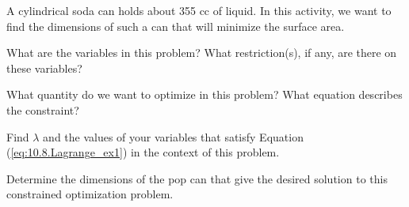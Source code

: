 \begin{activity} \label{A:10.8.1} A cylindrical soda can holds
  about 355 cc of liquid. In this activity, we want to find the
  dimensions of such a can that will minimize the surface area.  
\ba
    \item What are the variables in this problem? What restriction(s),
      if any, are there on these variables? 

    \item What quantity do we want to optimize in this problem? What
      equation describes the constraint? 

    \item Find $\lambda$ and the values of your variables that satisfy
      Equation (\ref{eq:10.8.Lagrange_ex1}) in the context of this
      problem. 

    \item Determine the dimensions of the pop can that give the
      desired solution to this constrained optimization problem. 


    \ea


\end{activity}
\begin{smallhint}

\end{smallhint}
\begin{bighint}

\end{bighint}
